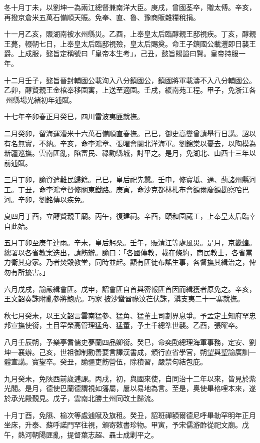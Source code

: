 \begin{pinyinscope}
冬十月丁未，以劉坤一為兩江總督兼南洋大臣。庚戌，曾國荃卒，贈太傅。辛亥，再撥京倉米五萬石備順天賑。免奉、直、魯、豫商販雜糧稅捐。

十一月乙亥，賑湖南被水州縣災。乙酉，上奉皇太后臨醇親王邸視疾。丁亥，醇親王薨，輟朝七日，上奉皇太后臨邸視殮，皇太后賜奠。命王子鎮國公載灃即日襲王爵。上成服，懿旨定稱號曰「皇帝本生考」，己丑，懿旨賜謚曰賢。皇帝持服一年。

十二月壬子，懿旨晉封輔國公載洵入八分鎮國公，鎮國將軍載濤不入八分輔國公。乙卯，醇賢親王金棺奉移園寓，上送至適園。壬戌，緩南苑工程。甲子，免浙江各州縣場光緒初年逋賦。

十七年辛卯春正月癸巳，四川雷波夷匪就撫。

二月癸卯，留海運漕米十六萬石備順直春撫。己巳，御史高燮曾請舉行日講。詔以有名無實，不納。辛亥，命李鴻章、張曜會閱北洋海軍。劉錦棠以憂去，以陶模為新疆巡撫。雲南匪亂，陷富民、祿勸縣城，討平之。是月，免湖北、山西十三年以前逋賦。

三月丁卯，諭資遣難民歸籍。己巳，皇后祀先蠶。壬申，修寶坻、通、薊諸州縣河工。丁丑，命李鴻章督修關東鐵路。庚寅，命沙克都林札布會額爾慶額勘察哈巴河。辛卯，劉銘傳以疾免。

夏四月丁酉，立醇賢親王廟。丙午，復建祠。辛酉，頤和園蕆工，上奉皇太后臨幸自此始。

五月丁卯至庚午連雨。辛未，皇后躬桑。壬午，賑清江等處風災。是月，京畿蝗。總署以各省教案迭出，請飭辦。諭曰：「各國傳教，載在條約，商民教士，各省當力衛其身家。乃者焚毀教堂，同時並起。顯有匪徒布謠生事，各督撫其緝治之，俾勿有所擾害。」

六月戊戌，諭嚴緝會匪。戊申，詔會匪自首與密報匪首因而緝獲者原免之。辛亥，王文韶奏誅附亂參將鮑虎。巧家披沙蠻酋祿汶芢伏誅，滇支夷二十一寨就撫。

秋七月癸未，以王文韶言雲南猛參、猛角、猛董土司劃界息爭。予孟定土知府罕忠邦宣撫使銜，土目罕榮高管理猛角、猛董，予土千總準世襲。乙酉，張曜卒。

八月壬辰朔，予樂亭耆儒史夢蘭四品卿銜。癸巳，命奕劻總理海軍事務，定安、劉坤一襄辦。己亥，世祖御制勸善要言譯漢書成，頒行直省學官，朔望與聖諭廣訓一體宣講。寶鋆卒。癸丑，諭疆吏飭營伍，除積習，嚴禁句結包庇。

九月癸未，免陜西前歲逋課。丙戌，初，與國來使，自同治十二年以來，皆見於紫光閣。是月，德使巴蘭德謂視如籓屬，屢以易地為言。至是，奧使畢格哩本來，遂於承光殿覲見。戊子，雲南北勝土州同改土歸流。

十月丁酉，免隰、榆次等處逋賦及旗租。癸丑，詔班禪額爾德尼呼畢勒罕明年正月坐床，升泰、蘇呼諾門罕往視，頒寄敕書珍物。甲寅，予宋儒游酢從祀文廟。戊午，熱河朝陽匪亂，提督葉志超、聶士成剿平之。


\end{pinyinscope}
